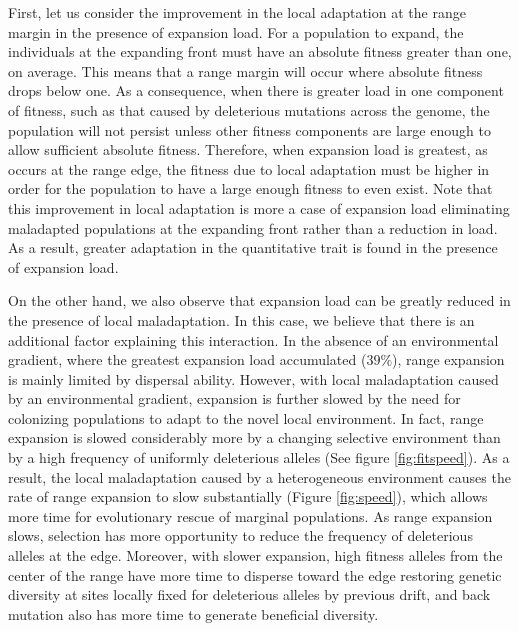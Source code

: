 First, let us consider the improvement in the local adaptation at the range margin in the presence of expansion load. For a population to expand, the individuals at the expanding front must have an absolute fitness greater than one, on average. This means that a range margin will occur where absolute fitness drops below one. As a consequence, when there is greater load in one component of fitness, such as that caused by deleterious mutations across the genome, the population will not persist unless other fitness components are large enough to allow sufficient absolute fitness. Therefore, when expansion load is greatest, as occurs at the range edge, the fitness due to local adaptation must be higher in order for the population to have a large enough fitness to even exist. Note that this improvement in local adaptation is more a case of expansion load eliminating maladapted populations at the expanding front rather than a reduction in load. As a result, greater adaptation in the quantitative trait is found in the presence of expansion load.

On the other hand, we also observe that expansion load can be greatly reduced in the presence of local maladaptation. In this case, we believe that there is an additional factor explaining this interaction.  In the absence of an environmental gradient, where the greatest expansion load accumulated ($39\%$), range expansion is mainly limited by dispersal ability. However, with local maladaptation caused by an environmental gradient, expansion is further slowed by the need for colonizing populations to adapt to the novel local environment. In fact, range expansion is slowed considerably more by a changing selective environment than by a high frequency of uniformly deleterious alleles (See figure \ref{fig:fitspeed}). As a result, the local maladaptation caused by a heterogeneous environment causes the rate of range expansion to slow substantially (Figure \ref{fig:speed}), which allows more time for evolutionary rescue of marginal populations. As range expansion slows, selection has more opportunity to reduce the frequency of deleterious alleles at the edge. Moreover, with slower expansion, high fitness alleles from the center of the range have more time to disperse toward the edge restoring genetic diversity at sites locally fixed for deleterious alleles by previous drift, and back mutation also has more time to generate beneficial diversity. 

